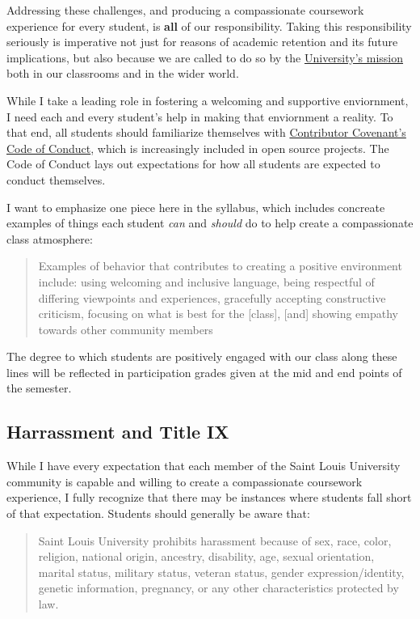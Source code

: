 \documentclass[]{book}
\theoremstyle{definition}
\theoremstyle{definition}
\theoremstyle{definition}
\theoremstyle{remark}
\begin{document}
Addressing these challenges, and producing a compassionate coursework
experience for every student, is \textbf{all} of our responsibility.
Taking this responsibility seriously is imperative not just for reasons
of academic retention and its future implications, but also because we
are called to do so by the
\href{https://www.slu.edu/about/catholic-jesuit-identity/mission.php}{University's
mission} both in our classrooms and in the wider world.

While I take a leading role in fostering a welcoming and supportive
enviornment, I need each and every student's help in making that
enviornment a reality. To that end, all students should familiarize
themselves with \href{https://www.contributor-covenant.org}{Contributor
Covenant's}
\href{https://www.contributor-covenant.org/version/1/4/code-of-conduct}{Code
of Conduct}, which is increasingly included in open source projects. The
Code of Conduct lays out expectations for how all students are expected
to conduct themselves.

I want to emphasize one piece here in the syllabus, which includes
concreate examples of things each student \emph{can} and \emph{should}
do to help create a compassionate class atmosphere:

\begin{quote}
Examples of behavior that contributes to creating a positive environment
include: using welcoming and inclusive language, being respectful of
differing viewpoints and experiences, gracefully accepting constructive
criticism, focusing on what is best for the {[}class{]}, {[}and{]}
showing empathy towards other community members
\end{quote}

The degree to which students are positively engaged with our class along
these lines will be reflected in participation grades given at the mid
and end points of the semester.

\subsection{Harrassment and Title IX}\label{harrassment-and-title-ix}

While I have every expectation that each member of the Saint Louis
University community is capable and willing to create a compassionate
coursework experience, I fully recognize that there may be instances
where students fall short of that expectation. Students should generally
be aware that:

\begin{quote}
Saint Louis University prohibits harassment because of sex, race, color,
religion, national origin, ancestry, disability, age, sexual
orientation, marital status, military status, veteran status, gender
expression/identity, genetic information, pregnancy, or any other
characteristics protected by law.
\end{quote}
\end{document}
